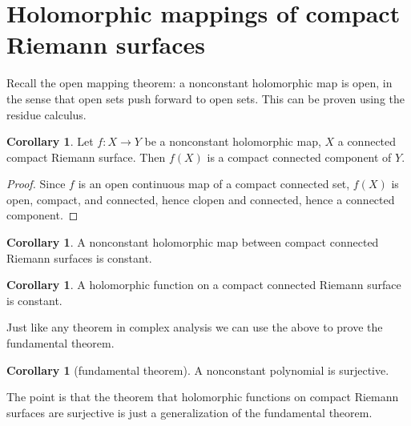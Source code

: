 \documentclass[12pt]{report}
\theoremstyle{definition}
\newtheorem{corollary}[theorem]{Corollary}
\begin{document}
\section{Holomorphic mappings of compact Riemann surfaces}
Recall the open mapping theorem: a nonconstant holomorphic map is open, in the sense that open sets push forward to open sets. This can be proven using the residue calculus.
\begin{corollary}
Let $f: X \to Y$ be a nonconstant holomorphic map, $X$ a connected compact Riemann surface. Then $f(X)$ is a compact connected component of $Y$.
\end{corollary}
\begin{proof}
Since $f$ is an open continuous map of a compact connected set, $f(X)$ is open, compact, and connected, hence clopen and connected, hence a connected component.
\end{proof}
\begin{corollary}
A nonconstant holomorphic map between compact connected Riemann surfaces is constant.
\end{corollary}
\begin{corollary}
A holomorphic function on a compact connected Riemann surface is constant.
\end{corollary}
Just like any theorem in complex analysis we can use the above to prove the fundamental theorem.
\begin{corollary}[fundamental theorem]
A nonconstant polynomial is surjective.
\end{corollary}
The point is that the theorem that holomorphic functions on compact Riemann surfaces are surjective is just a generalization of the fundamental theorem.
\end{document}
